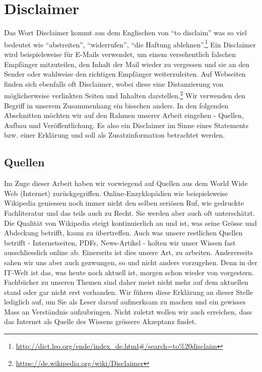 \section{Disclaimer}
Das Wort Disclaimer kommt aus dem Englischen von ``to disclaim'' was so viel bedeutet wie ``abstreiten'', ``widerrufen'', ``die Haftung ablehnen''.\footnote{\url{http://dict.leo.org/ende/index_de.html\#/search=to\%20disclaim}}
Ein Disclaimer wird beispielsweise für E-Mails verwendet, um einem versehentlich falschen Empfänger mitzuteilen, den Inhalt der Mail wieder zu vergessen und sie an den Sender oder wahlweise den richtigen Empfänger weiterzuleiten. Auf Webseiten finden sich ebenfalls oft Disclaimer, wobei diese eine Distanzierung von möglicherweise verlinkten Seiten und Inhalten darstellen.\footnote{\url{https://de.wikipedia.org/wiki/Disclaimer}}
Wir verwenden den Begriff in unserem Zusammenhang ein bisschen anders. In den folgenden Abschnitten möchten wir auf den Rahmen unserer Arbeit eingehen - Quellen, Aufbau und Veröffentlichung. Es also ein Disclaimer im Sinne eines Statements bzw. einer Erklärung und soll als Zusatzinformation betrachtet werden.

\subsection{Quellen}
Im Zuge dieser Arbeit haben wir vorwiegend auf Quellen aus dem World Wide Web (Internet) zurückgegriffen. Online-Enzyklopädien wie beispielsweise Wikipedia geniessen noch immer nicht den selben seriösen Ruf, wie gedruckte Fachliteratur und das teils auch zu Recht. Sie werden aber auch oft unterschätzt. Die Qualität von Wikipedia steigt kontinuierlich an und ist, was seine Grösse und Abdeckung betrifft, kaum zu übertreffen. Auch was unsere restlichen Quellen betrifft - Internetseiten, PDFs, News-Artikel - holten wir unser Wissen fast ausschliesslich online ab. Einerseits ist dies unsere Art, zu arbeiten. Andererseits sahen wir uns aber auch gezwungen, so und nicht anders vorzugehen. Denn in der IT-Welt ist das, was heute noch aktuell ist, morgen schon wieder von vorgestern. Fachbücher zu unseren Themen sind daher meist nicht mehr auf dem aktuellen stand oder gar nicht erst vorhanden. Wir führen diese Erklärung an dieser Stelle lediglich auf, um Sie als Leser darauf aufmerksam zu machen und ein gewisses Mass an Verständnis aufzubringen. Nicht zuletzt wollen wir auch erreichen, dass das Internet als Quelle des Wissens grössere Akzeptanz findet.

